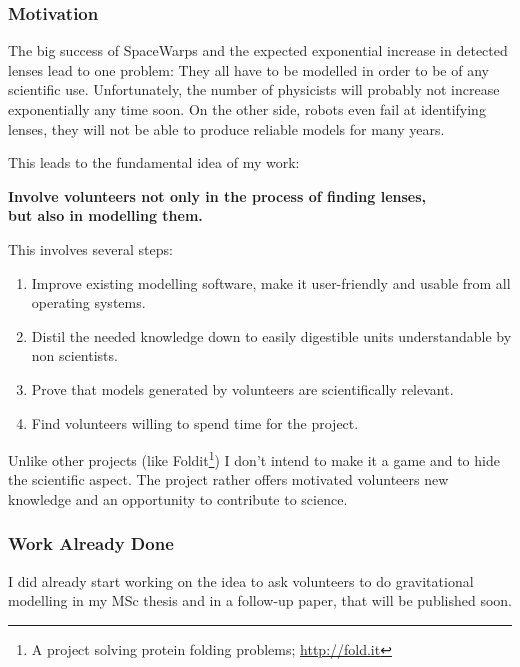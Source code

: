 \documentclass[11pt]{article}
\begin{document}
\subsubsection{Motivation}

The big success of SpaceWarps and the expected exponential increase in detected lenses lead to one problem:
They all have to be modelled in order to be of any scientific use.
Unfortunately, the number of physicists will probably not increase exponentially any time soon.
On the other side, robots even fail at identifying lenses, they will not be able to produce reliable models for many years.

This leads to the fundamental idea of my work:

{\bf Involve volunteers not only in the process of finding lenses,\\but also in modelling them.}

This involves several steps:

\begin{enumerate}
  \item Improve existing modelling software, make it user-friendly and usable from all operating systems.
  \item Distil the needed knowledge down to easily digestible units understandable by non scientists.
  \item Prove that models generated by volunteers are scientifically relevant.
  \item Find volunteers willing to spend time for the project.
\end{enumerate}

Unlike other projects (like Foldit\footnote{A project solving protein folding problems; \url{http://fold.it}}) I don't intend to make it a game and to hide the scientific aspect.
The project rather offers motivated volunteers new knowledge and an opportunity to contribute to science.


\subsubsection{Work Already Done}

I did already start working on the idea to ask volunteers to do gravitational modelling in my MSc thesis and in a follow-up paper, that will be published soon.
\end{document}

